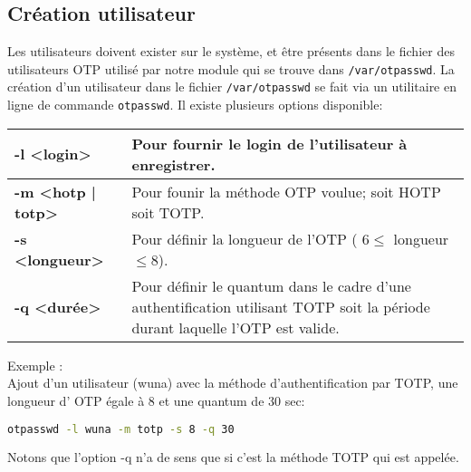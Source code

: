 \documentclass{"../../../res/univ-projet"}
\begin{document}
\subsection{Création utilisateur}
Les utilisateurs doivent exister sur le système, et être présents dans 
le fichier des utilisateurs OTP utilisé par notre module qui se trouve 
dans \verb?/var/otpasswd?. La création d'un utilisateur dans le fichier 
\verb?/var/otpasswd? se fait via un utilitaire en ligne de commande 
\verb?otpasswd?. Il existe plusieurs options disponible:
\newline
\begin{tabular}{|p{}p{}|}
\hline
\textbf{-l <login>} & Pour fournir le login de l'utilisateur à enregistrer.\\
\hline
\textbf{-m <hotp | totp>} & Pour founir la méthode OTP voulue; soit HOTP soit TOTP.\\
\hline
\textbf{-s <longueur>} & Pour définir la longueur de l'OTP ( $6 \leq$ longueur $\leq 8$).\\
\hline
\textbf{-q <durée>} & Pour définir le quantum dans le cadre d'une authentification utilisant 
TOTP soit la période durant laquelle l'OTP est valide.\\
\hline
\end{tabular}

Exemple :\\
Ajout d'un utilisateur (wuna) avec la méthode d'authentification par TOTP, une longueur d'
OTP égale à 8 et une quantum de 30 sec:
\begin{lstlisting}[language=bash, backgroundcolor=\color{black}, basicstyle=\color{white}]
otpasswd -l wuna -m totp -s 8 -q 30
\end{lstlisting}
Notons que l'option -q n'a de sens que si c'est la méthode TOTP qui est appelée.\\
\end{document}
